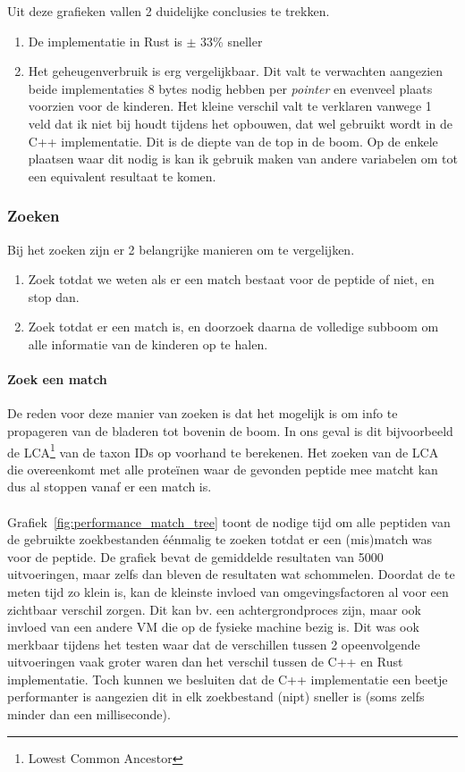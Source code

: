 Uit deze grafieken vallen 2 duidelijke conclusies te trekken.
\begin{enumerate}
    \item De implementatie in Rust is $\pm$ 33\% sneller
    \item Het geheugenverbruik is erg vergelijkbaar.
    Dit valt te verwachten aangezien beide implementaties 8 bytes nodig hebben per \textit{pointer} en evenveel plaats voorzien voor de kinderen.
    Het kleine verschil valt te verklaren vanwege 1 veld dat ik niet bij houdt tijdens het opbouwen, dat wel gebruikt wordt in de C++ implementatie.
    Dit is de diepte van de top in de boom.
    Op de enkele plaatsen waar dit nodig is kan ik gebruik maken van andere variabelen om tot een equivalent resultaat te komen.
\end{enumerate}

\subsubsection{Zoeken}
Bij het zoeken zijn er 2 belangrijke manieren om te vergelijken.
\begin{enumerate}
    \item Zoek totdat we weten als er een match bestaat voor de peptide of niet, en stop dan.
    \item Zoek totdat er een match is, en doorzoek daarna de volledige subboom om alle informatie van de kinderen op te halen.

\end{enumerate}

\paragraph{Zoek een match}
De reden voor deze manier van zoeken is dat het mogelijk is om info te propageren van de bladeren tot bovenin de boom.
In ons geval is dit bijvoorbeeld de LCA\footnote{Lowest Common Ancestor} van de taxon IDs op voorhand te berekenen.
Het zoeken van de LCA die overeenkomt met alle proteïnen waar de gevonden peptide mee matcht kan dus al stoppen vanaf er een match is.
\\ \\
Grafiek~\ref{fig:performance_match_tree} toont de nodige tijd om alle peptiden van de gebruikte zoekbestanden éénmalig te zoeken totdat er een (mis)match was voor de peptide.
De grafiek bevat de gemiddelde resultaten van 5000 uitvoeringen, maar zelfs dan bleven de resultaten wat schommelen.
Doordat de te meten tijd zo klein is, kan de kleinste invloed van omgevingsfactoren al voor een zichtbaar verschil zorgen.
Dit kan bv. een achtergrondproces zijn, maar ook invloed van een andere VM die op de fysieke machine bezig is.
Dit was ook merkbaar tijdens het testen waar dat de verschillen tussen 2 opeenvolgende uitvoeringen vaak groter waren dan het verschil tussen de C++ en Rust implementatie.
Toch kunnen we besluiten dat de C++ implementatie een beetje performanter is aangezien dit in elk zoekbestand (nipt) sneller is (soms zelfs minder dan een milliseconde).


